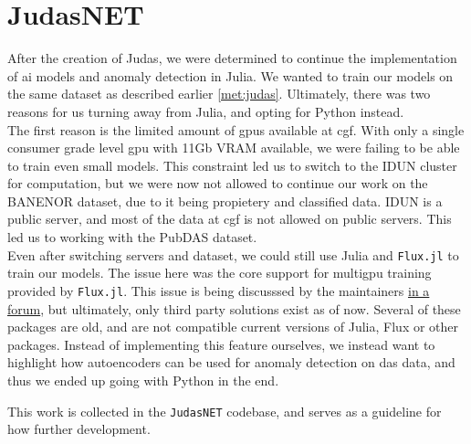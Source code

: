 \section{JudasNET}
\label{disc:judasnet}

After the creation of Judas, we were determined to continue the implementation of \acrshort{ai} models and anomaly detection in Julia. We wanted to train our models on the same dataset as described earlier \ref{met:judas}. Ultimately, there was two reasons for us turning away from Julia, and opting for Python instead. \\

The first reason is the limited amount of \acrshort{gpu}s available at \acrshort{cgf}. With only a single consumer grade level \acrshort{gpu} with 11Gb VRAM available, we were failing to be able to train even small models. This constraint led us to switch to the IDUN cluster for computation, but we were now not allowed to continue our work on the BANENOR dataset, due to it being propietery and classified data. IDUN is a public server, and most of the data at \acrshort{cgf} is not allowed on public servers. This led us to working with the PubDAS dataset. \\

Even after switching servers and dataset, we could still use Julia and \texttt{Flux.jl} to train our models. The issue here was the core support for multigpu training provided by \texttt{Flux.jl}. This issue is being discusssed by the maintainers \href{https://github.com/FluxML/Flux.jl/issues/1829}{in a forum}, but ultimately, only third party solutions exist as of now. Several of these packages are old, and are not compatible current versions of Julia, Flux or other packages. Instead of implementing this feature ourselves, we instead want to highlight how autoencoders can be used for anomaly detection on \acrshort{das} data, and thus we ended up going with Python in the end. 

This work is collected in the \texttt{JudasNET} codebase, and serves as a guideline for how further development.
